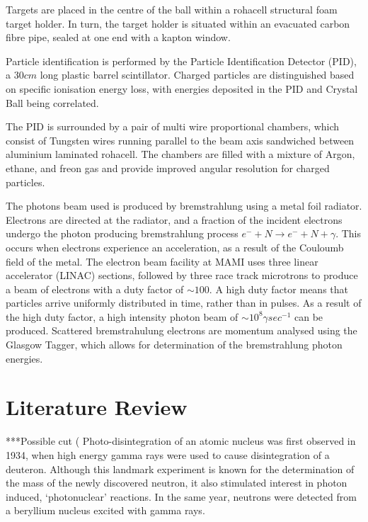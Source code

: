 \documentclass[a4paper,12pt]{article}
\begin{document}
Targets are placed in the centre of the ball within a rohacell structural foam target holder\cite{tarbertThesis}{}. In turn, the target holder is situated within an evacuated carbon fibre pipe, sealed at one end with a kapton window.

Particle identification is performed by the Particle Identification Detector (PID), a $30cm$ long plastic barrel scintillator. Charged particles are distinguished based on specific ionisation energy loss, with energies deposited in the PID and Crystal Ball being correlated\cite{tarbertThesis}{}.

The PID is surrounded by a pair of multi wire proportional chambers, which consist of Tungsten wires running parallel to the beam axis sandwiched between aluminium laminated rohacell. The chambers are filled with a mixture of Argon, ethane, and freon gas and provide improved angular resolution for charged particles\cite{tarbertThesis}{}.

The photons beam used is produced by bremstrahlung using a metal foil radiator\cite{watts}{}. Electrons are directed at the radiator, and a fraction of the incident electrons undergo the photon producing bremstrahlung process\cite{tarbertThesis}{} $e^{-}+N \rightarrow e^{-}+N+\gamma$. This occurs when electrons experience an acceleration, as a result of the Couloumb field of the metal. The electron beam facility at MAMI uses three linear accelerator (LINAC) sections, followed by three race track microtrons to produce a beam of electrons with a duty factor of $\sim100$. A high duty factor means that particles arrive uniformly distributed in time, rather than in pulses\cite{wiedemann}{}. As a result of the high duty factor, a high intensity photon beam of $\sim10^{8} \gamma sec^{-1}$ can be produced. Scattered bremstrahulung electrons are momentum analysed using the Glasgow Tagger\cite{anthonyTagger}{}, which allows for determination of the bremstrahlung photon energies\cite{watts}{}.

\section{Literature Review}

***Possible cut (
Photo-disintegration of an atomic nucleus was first observed in 1934, when high energy gamma rays were used to cause disintegration of a deuteron\cite{chadwick}{}. Although this landmark experiment is known for the  determination of the mass of the newly discovered neutron, it also stimulated interest in photon induced, `photonuclear' reactions. In the same year, neutrons were detected from a beryllium nucleus excited with gamma rays\cite{szilard}{}.
\end{document}
